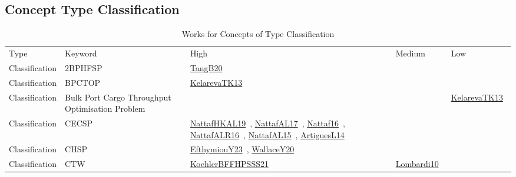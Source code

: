 \clearpage
\subsection{Concept Type Classification}
\label{sec:Classification}
{\scriptsize
\begin{longtable}{lp{3cm}>{\raggedright\arraybackslash}p{6cm}>{\raggedright\arraybackslash}p{6cm}>{\raggedright\arraybackslash}p{8cm}}
\rowcolor{white}\caption{Works for Concepts of Type Classification}\\ \toprule
\rowcolor{white}Type & Keyword & High & Medium & Low\\ \midrule\endhead
\bottomrule
\endfoot
Classification & 2BPHFSP & \href{../works/TangB20.pdf}{TangB20}~\cite{TangB20} &  & \\
Classification & BPCTOP & \href{../works/KelarevaTK13.pdf}{KelarevaTK13}~\cite{KelarevaTK13} &  & \\
Classification & Bulk Port Cargo Throughput Optimisation Problem &  &  & \href{../works/KelarevaTK13.pdf}{KelarevaTK13}~\cite{KelarevaTK13}\\
Classification & CECSP & \href{../works/NattafHKAL19.pdf}{NattafHKAL19}~\cite{NattafHKAL19}, \href{../works/NattafAL17.pdf}{NattafAL17}~\cite{NattafAL17}, \href{../works/Nattaf16.pdf}{Nattaf16}~\cite{Nattaf16}, \href{../works/NattafALR16.pdf}{NattafALR16}~\cite{NattafALR16}, \href{../works/NattafAL15.pdf}{NattafAL15}~\cite{NattafAL15}, \href{../works/ArtiguesL14.pdf}{ArtiguesL14}~\cite{ArtiguesL14} &  & \\
Classification & CHSP & \href{../works/EfthymiouY23.pdf}{EfthymiouY23}~\cite{EfthymiouY23}, \href{../works/WallaceY20.pdf}{WallaceY20}~\cite{WallaceY20} &  & \\
Classification & CTW & \href{../works/KoehlerBFFHPSSS21.pdf}{KoehlerBFFHPSSS21}~\cite{KoehlerBFFHPSSS21} & \href{../works/Lombardi10.pdf}{Lombardi10}~\cite{Lombardi10} & \\

\end{longtable}}
